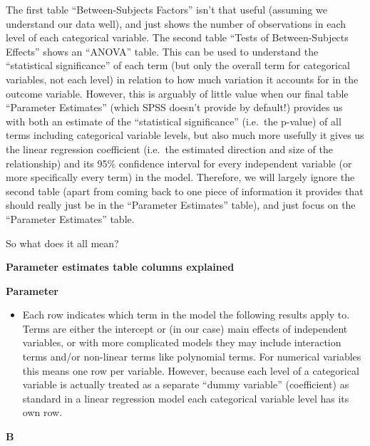 \documentclass[
]{book}
\providecommand{\tightlist}{%
  \setlength{\itemsep}{0pt}\setlength{\parskip}{0pt}}
\begin{document}
The first table ``Between-Subjects Factors'' isn't that useful (assuming we understand our data well), and just shows the number of observations in each level of each categorical variable. The second table ``Tests of Between-Subjects Effects'' shows an ``ANOVA'' table. This can be used to understand the ``statistical significance'' of each term (but only the overall term for categorical variables, not each level) in relation to how much variation it accounts for in the outcome variable. However, this is arguably of little value when our final table ``Parameter Estimates'' (which SPSS doesn't provide by default!) provides us with both an estimate of the ``statistical significance'' (i.e.~the p-value) of all terms including categorical variable levels, but also much more usefully it gives us the linear regression coefficient (i.e.~the estimated direction and size of the relationship) and its 95\% confidence interval for every independent variable (or more specifically every term) in the model. Therefore, we will largely ignore the second table (apart from coming back to one piece of information it provides that should really just be in the ``Parameter Estimates'' table), and just focus on the ``Parameter Estimates'' table.

So what does it all mean?

\textbf{Parameter estimates table columns explained}

\textbf{Parameter}

\begin{itemize}
\tightlist
\item
  Each row indicates which term in the model the following results apply to. Terms are either the intercept or (in our case) main effects of independent variables, or with more complicated models they may include interaction terms and/or non-linear terms like polynomial terms. For numerical variables this means one row per variable. However, because each level of a categorical variable is actually treated as a separate ``dummy variable'' (coefficient) as standard in a linear regression model each categorical variable level has its own row.
\end{itemize}

\textbf{B}
\end{document}

